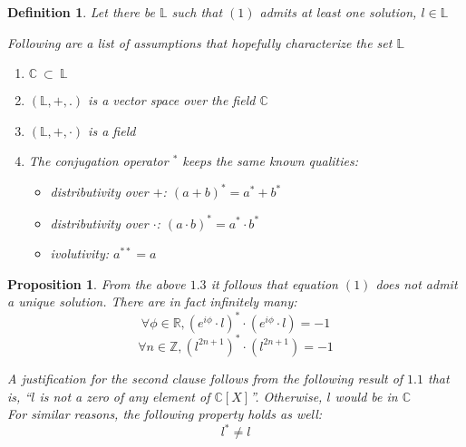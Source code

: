 \documentclass{article}
\newtheorem{proposition}{Proposition}
\newtheorem{definition}{Definition}
\begin{document}
\begin{definition}
    Let there be $\mathbb{L}$ such that $(1)$ admits at least one solution,
    $l \in \mathbb{L}$

    Following are a list of assumptions that hopefully characterize the set $\mathbb{L}$
    \begin{enumerate}
        \item $\mathbb{C}\ \subset\ \mathbb{L}$
        \item $(\mathbb{L},+,.)$ is a vector space over the field $\mathbb{C}$
        \item $(\mathbb{L},+,\cdot)$ is a field
        \item The conjugation operator $^{*}$ keeps the same known qualities:
            \begin{itemize}
                \item distributivity over $+$: $(a+b)^{*}=a^{*}+b^{*}$
                \item distributivity over $\cdot$: $(a \cdot b)^{*} = a^{*}\cdot b^{*}$
                \item ivolutivity: $a^{**} = a$
            \end{itemize}
    \end{enumerate}
\end{definition}


\begin{proposition}
    From the above $1.3$ it follows that equation $(1)$ does not admit
    a unique solution. There are in fact infinitely many:
    $$\forall \phi \in \mathbb{R}, (e^{i\phi}\cdot l)^{*}\cdot (e^{i\phi}\cdot l) = -1 $$
    $$\forall n \in \mathbb{Z}, (l^{2n+1})^{*}\cdot (l^{2n+1}) = -1 $$

    A justification for the second clause follows from the following result of $1.1$
    that is, ``$l$ is not a zero of any element of $\mathbb{C}[X]$''. Otherwise,
    $l$ would be in $\mathbb{C}$\\
    For similar reasons, the following property holds as well:
    $$ l^{*} \neq l $$ 
\end{proposition}
\end{document}
